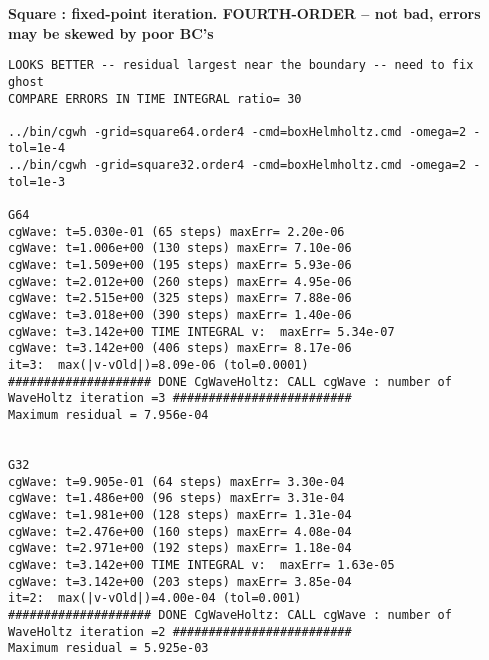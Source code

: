 \bigskip
\textbf{Square : fixed-point iteration. FOURTH-ORDER -- not bad, errors may be skewed by poor BC's }
\begin{Verbatim}[fontsize=\scriptsize]
LOOKS BETTER -- residual largest near the boundary -- need to fix ghost 
COMPARE ERRORS IN TIME INTEGRAL ratio= 30 

../bin/cgwh -grid=square64.order4 -cmd=boxHelmholtz.cmd -omega=2 -tol=1e-4
../bin/cgwh -grid=square32.order4 -cmd=boxHelmholtz.cmd -omega=2 -tol=1e-3

G64
cgWave: t=5.030e-01 (65 steps) maxErr= 2.20e-06
cgWave: t=1.006e+00 (130 steps) maxErr= 7.10e-06
cgWave: t=1.509e+00 (195 steps) maxErr= 5.93e-06
cgWave: t=2.012e+00 (260 steps) maxErr= 4.95e-06
cgWave: t=2.515e+00 (325 steps) maxErr= 7.88e-06
cgWave: t=3.018e+00 (390 steps) maxErr= 1.40e-06
cgWave: t=3.142e+00 TIME INTEGRAL v:  maxErr= 5.34e-07
cgWave: t=3.142e+00 (406 steps) maxErr= 8.17e-06
it=3:  max(|v-vOld|)=8.09e-06 (tol=0.0001)
#################### DONE CgWaveHoltz: CALL cgWave : number of WaveHoltz iteration =3 #########################
Maximum residual = 7.956e-04


G32
cgWave: t=9.905e-01 (64 steps) maxErr= 3.30e-04
cgWave: t=1.486e+00 (96 steps) maxErr= 3.31e-04
cgWave: t=1.981e+00 (128 steps) maxErr= 1.31e-04
cgWave: t=2.476e+00 (160 steps) maxErr= 4.08e-04
cgWave: t=2.971e+00 (192 steps) maxErr= 1.18e-04
cgWave: t=3.142e+00 TIME INTEGRAL v:  maxErr= 1.63e-05
cgWave: t=3.142e+00 (203 steps) maxErr= 3.85e-04
it=2:  max(|v-vOld|)=4.00e-04 (tol=0.001)
#################### DONE CgWaveHoltz: CALL cgWave : number of WaveHoltz iteration =2 #########################
Maximum residual = 5.925e-03
\end{Verbatim}


